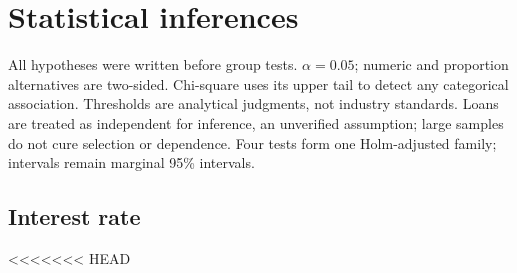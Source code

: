 \documentclass[10pt,a4paper,twocolumn]{article}
\begin{document}
\section{Statistical inferences}
All hypotheses were written before group tests. $\alpha=0.05$; numeric and proportion alternatives are two-sided. Chi-square uses its upper tail to detect any categorical association. Thresholds are analytical judgments, not industry standards. Loans are treated as independent for inference, an unverified assumption; large samples do not cure selection or dependence. Four tests form one Holm-adjusted family; intervals remain marginal 95\% intervals.

\subsection{Interest rate}
<<<<<<< HEAD
\end{document}
